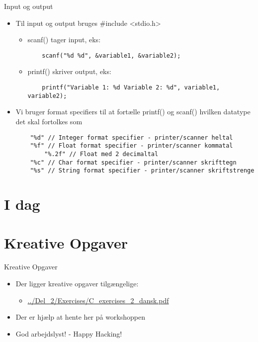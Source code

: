 \documentclass{beamer}
\begin{document}
\begin{frame}[fragile]{Input og output}
	\begin{itemize}
		\item{Til input og output bruges {\color{C_lightblue}\#include <stdio.h>}}
		\begin{itemize}
			\item{{\color{C_darkblue}scanf}() tager input, eks:}
			\begin{lstlisting}
	scanf("%d %d", &variable1, &variable2);
			\end{lstlisting}
			\item{{\color{C_darkblue}printf}() skriver output, eks:}
			\begin{lstlisting}
	printf("Variable 1: %d Variable 2: %d", variable1, variable2);
			\end{lstlisting}
		\end{itemize}
		\item{Vi bruger {\color{dkgreen}format specifiers} til at fortælle {\color{C_darkblue}printf}() og {\color{C_darkblue}scanf}() hvilken datatype det skal fortolkes som}
		\begin{lstlisting}
	"%d" // Integer format specifier - printer/scanner heltal
	"%f" // Float format specifier - printer/scanner kommatal
		"%.2f" // Float med 2 decimaltal
	"%c" // Char format specifier - printer/scanner skrifttegn
	"%s" // String format specifier - printer/scanner skriftstrenge
		\end{lstlisting}
	\end{itemize}
\end{frame}

\section{I dag}

\section{Kreative Opgaver}
\begin{frame}{Kreative Opgaver}
	\begin{itemize}
	\item{Der ligger kreative opgaver tilgængelige:}
		\begin{itemize}
		\item{\color{link}\href{https://github.com/Iakop/C-Programmering-for-begyndere/tree/master/Del_2/Exercises/C_exercises_2_dansk.pdf}{../Del\_2/Exercises/C\_exercises\_2\_dansk.pdf}}
		\end{itemize}
	\item{Der er hjælp at hente her på workshoppen}
	\item{God arbejdslyst! - Happy Hacking!}
	\end{itemize}
\end{frame}
\end{document}

